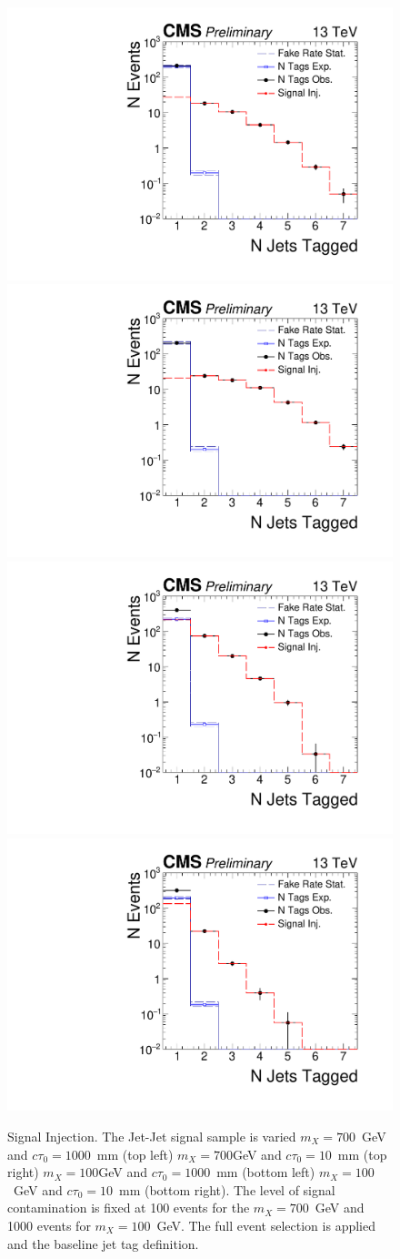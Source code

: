 \begin{figure}
\begin{center}
\includegraphics[width=.45\textwidth]{figures/an/ANALYSIS/76x_pu/INJECTION/mx700_ctau1000mm_100ev.pdf}
\includegraphics[width=.45\textwidth]{figures/an/ANALYSIS/76x_pu/INJECTION/qcd_loose_displacedEvtSel_100eV.pdf}\\
\includegraphics[width=.45\textwidth]{figures/an/ANALYSIS/76x_pu/INJECTION/mx100_ctau10mm_1000ev.pdf}
\includegraphics[width=.45\textwidth]{figures/an/ANALYSIS/76x_pu/INJECTION/mx100_ctau1000mm_1000ev.pdf}\\
\caption{Signal Injection. The Jet-Jet signal sample is varied $m_X=700$~GeV and $c\tau_0=1000$~mm (top left) 
$m_X=700$GeV and $c\tau_0=10$~mm (top right) $m_X=100$GeV and $c\tau_0=1000$~mm (bottom left) $m_X=100$~GeV and $c\tau_0=10$~mm (bottom right).
The level of signal contamination is fixed at 100 events for the $m_X=700$~GeV and 1000 events for $m_X=100$~GeV. The full 
event selection is applied and the baseline jet tag definition.  
\label{fig:injection_100gev_700gev_100ev}}
\end{center}
\end{figure}

